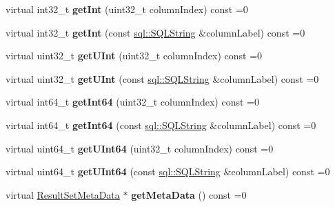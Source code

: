 \begin{DoxyCompactItemize}
\hypertarget{classsql_1_1_result_set_a7add7c19076adf7287e2e53254690778}{}\label{classsql_1_1_result_set_a7add7c19076adf7287e2e53254690778} 
virtual int32\+\_\+t {\bfseries get\+Int} (uint32\+\_\+t column\+Index) const =0
\item 
\hypertarget{classsql_1_1_result_set_a525ddf25b78419efd6c393db0fa48b3e}{}\label{classsql_1_1_result_set_a525ddf25b78419efd6c393db0fa48b3e} 
virtual int32\+\_\+t {\bfseries get\+Int} (const \hyperlink{classsql_1_1_s_q_l_string}{sql\+::\+S\+Q\+L\+String} \&column\+Label) const =0
\item 
\hypertarget{classsql_1_1_result_set_ab6e8407a6a5f683e260f08e3be5ab058}{}\label{classsql_1_1_result_set_ab6e8407a6a5f683e260f08e3be5ab058} 
virtual uint32\+\_\+t {\bfseries get\+U\+Int} (uint32\+\_\+t column\+Index) const =0
\item 
\hypertarget{classsql_1_1_result_set_a40f2f3c145f566ca11c446a13b4e036e}{}\label{classsql_1_1_result_set_a40f2f3c145f566ca11c446a13b4e036e} 
virtual uint32\+\_\+t {\bfseries get\+U\+Int} (const \hyperlink{classsql_1_1_s_q_l_string}{sql\+::\+S\+Q\+L\+String} \&column\+Label) const =0
\item 
\hypertarget{classsql_1_1_result_set_abe6564285ad248b2a702f8f8509caa53}{}\label{classsql_1_1_result_set_abe6564285ad248b2a702f8f8509caa53} 
virtual int64\+\_\+t {\bfseries get\+Int64} (uint32\+\_\+t column\+Index) const =0
\item 
\hypertarget{classsql_1_1_result_set_ac7dc2d7c616d3ac9632dcdd2e7d1fbab}{}\label{classsql_1_1_result_set_ac7dc2d7c616d3ac9632dcdd2e7d1fbab} 
virtual int64\+\_\+t {\bfseries get\+Int64} (const \hyperlink{classsql_1_1_s_q_l_string}{sql\+::\+S\+Q\+L\+String} \&column\+Label) const =0
\item 
\hypertarget{classsql_1_1_result_set_ad5cefbe8e7db0d77963c5f335904e044}{}\label{classsql_1_1_result_set_ad5cefbe8e7db0d77963c5f335904e044} 
virtual uint64\+\_\+t {\bfseries get\+U\+Int64} (uint32\+\_\+t column\+Index) const =0
\item 
\hypertarget{classsql_1_1_result_set_ac223fb68885fb553ece9a70823739244}{}\label{classsql_1_1_result_set_ac223fb68885fb553ece9a70823739244} 
virtual uint64\+\_\+t {\bfseries get\+U\+Int64} (const \hyperlink{classsql_1_1_s_q_l_string}{sql\+::\+S\+Q\+L\+String} \&column\+Label) const =0
\item 
\hypertarget{classsql_1_1_result_set_a7996dd90829b98d833937e81a224174a}{}\label{classsql_1_1_result_set_a7996dd90829b98d833937e81a224174a} 
virtual \hyperlink{classsql_1_1_result_set_meta_data}{Result\+Set\+Meta\+Data} $\ast$ {\bfseries get\+Meta\+Data} () const =0

\end{DoxyCompactItemize}
